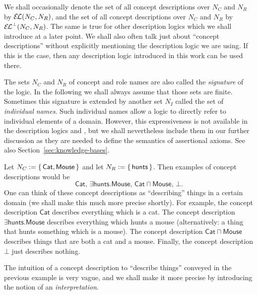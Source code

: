 We shall occasionally denote the set of all \EL concept descriptions over $N_C$ and $N_R$
by ${\mathcal{E}\kern-.3ex\mathcal{L}}(N_C, N_R)$, and the set of all \ELbot concept descriptions over $N_C$ and $N_R$ by
${{\mathcal{E}\kern-.3ex\mathcal{L}}^\bot}(N_C, N_R)$.  The same is true for other description logics which we shall
introduce at a later point.  We shall also often talk just about ``concept descriptions''
without explicitly mentioning the description logic we are using.  If this is the case,
then any description logic introduced in this work can be used there.

The sets $N_C$ and $N_R$ of concept and role names are also called the \emph{signature} of
the logic.  In the following we shall always assume that those sets are finite.  Sometimes
this signature is extended by another set $N_I$ called the set of \emph{individual names}.
Such individual names allow a logic to directly refer to individual elements of a domain.
However, this expressiveness is not available in the description logics \EL and \ELbot,
but we shall nevertheless include them in our further discussion as they are needed to
define the semantics of assertional axioms.  See also Section~\ref{sec:knowledge-bases}.

\begin{Example}
  \label{expl:tom-and-jerry-1}
  Let $N_C := {\{\, \mathsf{Cat}, \mathsf{Mouse} \,\}}$ and let $N_R := {\{\, \mathsf{hunts}
  \,\}}$.  Then examples of \ELbot concept descriptions would be
  \begin{equation*}
    \mathsf{Cat}, \, \mathsf{\exists hunts. Mouse}, \, \mathsf{Cat \sqcap Mouse}, \, \bot.
  \end{equation*}
  One can think of these concept descriptions as ``describing'' things in a certain domain
  (we shall make this much more precise shortly).  For example, the concept description
  $\mathsf{Cat}$ describes everything which is a cat.  The concept description
  $\mathsf{\exists hunts. Mouse}$ describes everything which hunts a mouse (alternatively:
  a thing that hunts something which is a mouse).  The concept description $\mathsf{Cat
    \sqcap Mouse}$ describes things that are both a cat and a mouse.  Finally, the concept
  description $\bot$ just describes nothing.
\end{Example}

The intuition of a concept description to ``describe things'' conveyed in the previous
example is very vague, and we shall make it more precise by introducing the notion of an
\emph{interpretation}.

